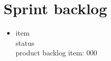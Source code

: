 \chapter{Sprint backlog}

\begin{itemize}
\item item \\ 
      status \\
      product backlog item: 000 \\
\end{itemize}
